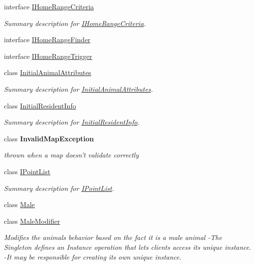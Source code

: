 \begin{DoxyCompactItemize}
interface \hyperlink{interface_s_e_a_r_c_h_1_1_i_home_range_criteria}{I\-Home\-Range\-Criteria}
\begin{DoxyCompactList}\small\item\em Summary description for \hyperlink{interface_s_e_a_r_c_h_1_1_i_home_range_criteria}{I\-Home\-Range\-Criteria}. \end{DoxyCompactList}\item 
interface \hyperlink{interface_s_e_a_r_c_h_1_1_i_home_range_finder}{I\-Home\-Range\-Finder}
\item 
interface \hyperlink{interface_s_e_a_r_c_h_1_1_i_home_range_trigger}{I\-Home\-Range\-Trigger}
\item 
class \hyperlink{class_s_e_a_r_c_h_1_1_initial_animal_attributes}{Initial\-Animal\-Attributes}
\begin{DoxyCompactList}\small\item\em Summary description for \hyperlink{class_s_e_a_r_c_h_1_1_initial_animal_attributes}{Initial\-Animal\-Attributes}. \end{DoxyCompactList}\item 
class \hyperlink{class_s_e_a_r_c_h_1_1_initial_resident_info}{Initial\-Resident\-Info}
\begin{DoxyCompactList}\small\item\em Summary description for \hyperlink{class_s_e_a_r_c_h_1_1_initial_resident_info}{Initial\-Resident\-Info}. \end{DoxyCompactList}\item 
class {\bfseries Invalid\-Map\-Exception}
\begin{DoxyCompactList}\small\item\em thrown when a map doesn't validate correctly \end{DoxyCompactList}\item 
class \hyperlink{class_s_e_a_r_c_h_1_1_i_point_list}{I\-Point\-List}
\begin{DoxyCompactList}\small\item\em Summary description for \hyperlink{class_s_e_a_r_c_h_1_1_i_point_list}{I\-Point\-List}. \end{DoxyCompactList}\item 
class \hyperlink{class_s_e_a_r_c_h_1_1_male}{Male}
\item 
class \hyperlink{class_s_e_a_r_c_h_1_1_male_modifier}{Male\-Modifier}
\begin{DoxyCompactList}\small\item\em Modifies the animals behavior based on the fact it is a male animal -\/\-The Singleton defines an Instance operation that lets clients access its unique instance. -\/\-It may be responsible for creating its own unique instance. \end{DoxyCompactList}\item 

\end{DoxyCompactItemize}
